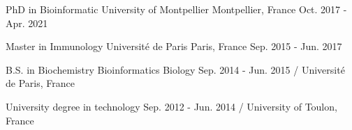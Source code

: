 

\begin{cventries}

  \cvhonor
    {PhD in Bioinformatic} %
    {University of Montpellier} %
    {Montpellier, France} %
    {Oct. 2017 - Apr. 2021} %

  \cvhonor
    {Master in Immunology} %
    {Université de Paris} %
    {Paris, France} %
    {Sep. 2015 - Jun. 2017} %
    
  \cvskill
    {B.S. in Biochemistry Bioinformatics Biology} %
    {Sep. 2014 - Jun. 2015 /  Université de Paris, France} %

  \cvskill
    {University degree in technology} %
    {Sep. 2012 - Jun. 2014 / University of Toulon, France} %


\end{cventries}
